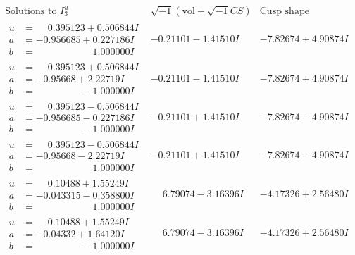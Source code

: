 \documentclass[1p]{elsarticle_modified}
\theoremstyle{definition}
\newcommand{\I}{\sqrt{-1}}
\begin{document}
$$\begin{array}{c|c|c}  
\text{Solutions to }I^u_{3}& \I (\text{vol} + \sqrt{-1}CS) & \text{Cusp shape}\\
 \hline 
\begin{aligned}
u &= \phantom{-}0.395123 + 0.506844 I \\
a &= -0.956685 + 0.227186 I \\
b &= \phantom{-0.000000 -}1.000000 I\end{aligned}
 & -0.21101 - 1.41510 I & -7.82674 + 4.90874 I \\ \hline\begin{aligned}
u &= \phantom{-}0.395123 + 0.506844 I \\
a &= -0.95668 + 2.22719 I \\
b &= \phantom{-0.000000 } -1.000000 I\end{aligned}
 & -0.21101 - 1.41510 I & -7.82674 + 4.90874 I \\ \hline\begin{aligned}
u &= \phantom{-}0.395123 - 0.506844 I \\
a &= -0.956685 - 0.227186 I \\
b &= \phantom{-0.000000 } -1.000000 I\end{aligned}
 & -0.21101 + 1.41510 I & -7.82674 - 4.90874 I \\ \hline\begin{aligned}
u &= \phantom{-}0.395123 - 0.506844 I \\
a &= -0.95668 - 2.22719 I \\
b &= \phantom{-0.000000 -}1.000000 I\end{aligned}
 & -0.21101 + 1.41510 I & -7.82674 - 4.90874 I \\ \hline\begin{aligned}
u &= \phantom{-}0.10488 + 1.55249 I \\
a &= -0.043315 - 0.358800 I \\
b &= \phantom{-0.000000 -}1.000000 I\end{aligned}
 & \phantom{-}6.79074 - 3.16396 I & -4.17326 + 2.56480 I \\ \hline\begin{aligned}
u &= \phantom{-}0.10488 + 1.55249 I \\
a &= -0.04332 + 1.64120 I \\
b &= \phantom{-0.000000 } -1.000000 I\end{aligned}
 & \phantom{-}6.79074 - 3.16396 I & -4.17326 + 2.56480 I \\ \hline\begin{aligned}

\end{aligned}
\end{array}$$
\end{document}
